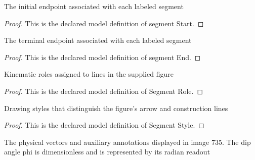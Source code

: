 \begin{definition}
  \label{def:physics:phyx-mini-0735:phyxminiproblems-problemphyxmini0735-segmentstart}
  The initial endpoint associated with each labeled segment
\end{definition}
\begin{proof}
  This is the declared model definition of segment Start.
\end{proof}
\begin{definition}
  \label{def:physics:phyx-mini-0735:phyxminiproblems-problemphyxmini0735-segmentend}
  The terminal endpoint associated with each labeled segment
\end{definition}
\begin{proof}
  This is the declared model definition of segment End.
\end{proof}
\begin{definition}
  \label{def:physics:phyx-mini-0735:phyxminiproblems-problemphyxmini0735-segmentrole}
  Kinematic roles assigned to lines in the supplied figure
\end{definition}
\begin{proof}
  This is the declared model definition of Segment Role.
\end{proof}
\begin{definition}
  \label{def:physics:phyx-mini-0735:phyxminiproblems-problemphyxmini0735-segmentstyle}
  Drawing styles that distinguish the figure's arrow and construction lines
\end{definition}
\begin{proof}
  This is the declared model definition of Segment Style.
\end{proof}
\begin{definition}
  \label{def:physics:phyx-mini-0735:phyxminiproblems-problemphyxmini0735-faultplanefigure}
  The physical vectors and auxiliary annotations displayed in image 735. The dip angle phi is dimensionless and is represented by its radian readout
\end{definition}
